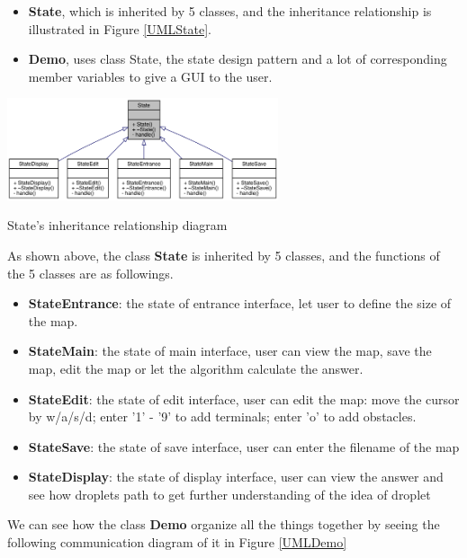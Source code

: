 \documentclass[twocolumn]{article}
\begin{document}
\begin{itemize}
    \item \textbf{State}, which is inherited by 5 classes, and the inheritance relationship is illustrated in Figure \ref{UMLState}.
    \item \textbf{Demo}, uses class State, the state design pattern and a lot of corresponding member variables to give a GUI to the user.
\end{itemize}

\begin{center}
\makeatletter
\def\@captype{figure}
\makeatother
\includegraphics [height=3cm]{UMLState}
\caption{State's inheritance relationship diagram}
\label{UMLState}
\end{center}

As shown above, the class \textbf{State} is inherited by 5 classes, and the functions of the 5 classes are as followings.

\begin{itemize}
    \item \textbf{StateEntrance}: the state of entrance interface, let user to define the size of the map.
    \item \textbf{StateMain}: the state of main interface, user can view the map, save the map, edit the map or let the algorithm calculate the answer.
    \item \textbf{StateEdit}: the state of edit interface, user can edit the map: move the cursor by w/a/s/d; enter '1' - '9' to add terminals; enter 'o' to add obstacles.
    \item \textbf{StateSave}: the state of save interface, user can enter the filename of the map
    \item \textbf{StateDisplay}: the state of display interface, user can view the answer and see how droplets path to get further understanding of the idea of droplet
\end{itemize}

We can see how the class \textbf{Demo} organize all the things together by seeing the following communication diagram of it in Figure \ref{UMLDemo}
\end{document}
